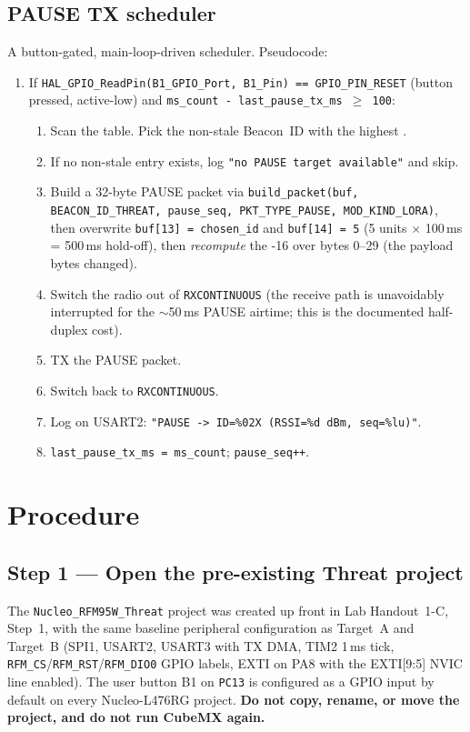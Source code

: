 \documentclass[11pt,letterpaper]{article}
\begin{document}
\subsection{PAUSE TX scheduler}
A button-gated, main-loop-driven scheduler. Pseudocode:
\begin{enumerate}[leftmargin=2em]
	\item If \texttt{HAL\_GPIO\_ReadPin(B1\_GPIO\_Port, B1\_Pin) == GPIO\_PIN\_RESET} (button pressed, active-low) and \texttt{ms\_count - last\_pause\_tx\_ms $\geq$ 100}:
	\begin{enumerate}[leftmargin=1.2em, label=(\alph*)]
		\item Scan the \RSSI{} table. Pick the non-stale Beacon~ID with the highest \RSSI{}.
		\item If no non-stale entry exists, log \texttt{"no PAUSE target available"} and skip.
		\item Build a 32-byte PAUSE packet via \texttt{build\_packet(buf, BEACON\_ID\_THREAT, pause\_seq, PKT\_TYPE\_PAUSE, MOD\_KIND\_LORA)}, then overwrite \texttt{buf[13] = chosen\_id} and \texttt{buf[14] = 5} (5 units $\times$ 100\,ms = 500\,ms hold-off), then \emph{recompute} the \CRC{}-16 over bytes 0--29 (the payload bytes changed).
		\item Switch the radio out of \texttt{RXCONTINUOUS} (the receive path is unavoidably interrupted for the $\sim$50\,ms PAUSE airtime; this is the documented half-duplex cost).
		\item TX the PAUSE packet.
		\item Switch back to \texttt{RXCONTINUOUS}.
		\item Log on USART2: \texttt{"PAUSE -> ID=\%02X (RSSI=\%d dBm, seq=\%lu)"}.
		\item \texttt{last\_pause\_tx\_ms = ms\_count}; \texttt{pause\_seq++}.
	\end{enumerate}
\end{enumerate}

\newpage
\section{Procedure}

\subsection{Step 1 --- Open the pre-existing Threat project}

The \texttt{Nucleo\_RFM95W\_Threat} project was created up front in Lab Handout~1-C, Step~1, with the same baseline peripheral configuration as Target~A and Target~B (SPI1, USART2, USART3 with TX DMA, TIM2 1\,ms tick, \texttt{RFM\_CS}/\texttt{RFM\_RST}/\texttt{RFM\_DIO0} GPIO labels, EXTI on PA8 with the EXTI[9:5] NVIC line enabled). The user button B1 on \texttt{PC13} is configured as a GPIO input by default on every Nucleo-L476RG project. \textbf{Do not copy, rename, or move the project, and do not run CubeMX again.}
\end{document}
